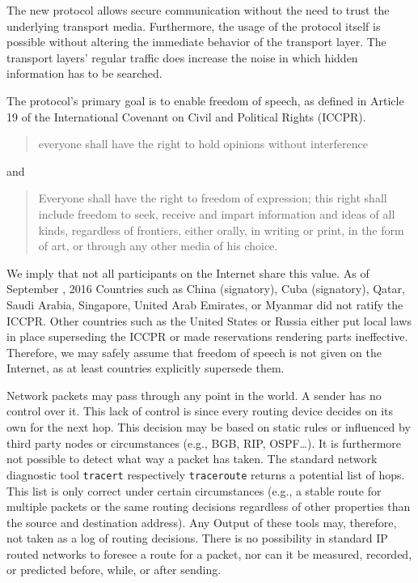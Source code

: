 The new protocol allows secure communication without the need to trust the underlying transport media. Furthermore, the usage of the protocol itself is possible without altering the immediate behavior of the transport layer. The transport layers' regular traffic does increase the noise in which hidden information has to be searched. 

The protocol's primary goal is to enable freedom of speech, as defined in Article 19 of the International Covenant on Civil and Political Rights (ICCPR)\cite{iccpr}.
\begin{quote}
	everyone shall have the right to hold opinions without interference 
\end{quote}
and
\begin{quote}
	Everyone shall have the right to freedom of expression; this right shall include freedom to seek, receive and impart information and ideas of all kinds, regardless of frontiers, either orally, in writing or print, in the form of art, or through any other media of his choice.
\end{quote}

We imply that not all participants on the Internet share this value. As of September , 2016 Countries such as China (signatory), Cuba (signatory), Qatar, Saudi Arabia, Singapore, United Arab Emirates, or Myanmar did not ratify the ICCPR. Other countries such as the United States or Russia either put local laws in place superseding the ICCPR or made reservations rendering parts ineffective. Therefore, we may safely assume that freedom of speech is not given on the Internet, as at least countries explicitly supersede them.

Network packets may pass through any point in the world. A sender has no control over it. This lack of control is since every routing device decides on its own for the next hop. This decision may be based on static rules or influenced by third party nodes or circumstances (e.g., BGB, RIP, OSPF\ldots). It is furthermore not possible to detect what way a packet has taken. The standard network diagnostic tool \verb|tracert| respectively \verb|traceroute| returns a potential list of hops. This list is only correct under certain circumstances (e.g., a stable route for multiple packets or the same routing decisions regardless of other properties than the source and destination address). Any Output of these tools may, therefore, not taken as a log of routing decisions. There is no possibility in standard IP routed networks to foresee a route for a packet, nor can it be measured, recorded, or predicted before, while, or after sending. 

